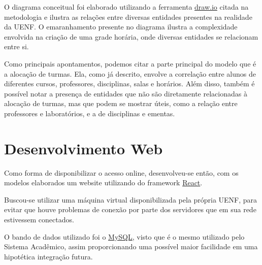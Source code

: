 
O diagrama conceitual foi elaborado utilizando a ferramenta \href{https://www.drawio.com/}{draw.io} citada na metodologia e ilustra as relações entre diversas entidades presentes na realidade da UENF. O emaranhamento presente no diagrama ilustra a complexidade envolvida na criação de uma grade horária, onde diversas entidades se relacionam entre si.

Como principais apontamentos, podemos citar a parte principal do modelo que é a alocação de turmas. Ela, como já descrito, envolve a correlação entre alunos de diferentes cursos, professores, disciplinas, salas e horários. Além disso, também é possível notar a presença de entidades que não são diretamente relacionadas à alocação de turmas, mas que podem se mostrar úteis, como a relação entre professores e laboratórios, e a de disciplinas e ementas.

\section{Desenvolvimento Web} %

Como forma de disponibilizar o acesso online, desenvolveu-se então, com os modelos elaborados um website utilizando do framework \href{https://react.dev/}{React}.

Buscou-se utilizar uma máquina virtual disponibilizada pela própria UENF, para evitar que houve problemas de conexão por parte dos servidores que em sua rede estivessem conectados.

O bando de dados utilizado foi o \href{https://dev.mysql.com/}{MySQL}, visto que é o mesmo utilizado pelo Sistema Acadêmico, assim proporcionando uma possível maior facilidade em uma hipotética integração futura.



